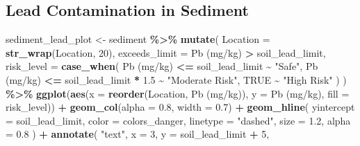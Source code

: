 \documentclass[
]{article}
\newenvironment{Shaded}{\begin{snugshade}}{\end{snugshade}}
\newcommand{\AttributeTok}[1]{\textcolor[rgb]{0.13,0.29,0.53}{#1}}
\newcommand{\ConstantTok}[1]{\textcolor[rgb]{0.56,0.35,0.01}{#1}}
\newcommand{\DecValTok}[1]{\textcolor[rgb]{0.00,0.00,0.81}{#1}}
\newcommand{\FloatTok}[1]{\textcolor[rgb]{0.00,0.00,0.81}{#1}}
\newcommand{\FunctionTok}[1]{\textcolor[rgb]{0.13,0.29,0.53}{\textbf{#1}}}
\newcommand{\NormalTok}[1]{#1}
\newcommand{\OtherTok}[1]{\textcolor[rgb]{0.56,0.35,0.01}{#1}}
\newcommand{\SpecialCharTok}[1]{\textcolor[rgb]{0.81,0.36,0.00}{\textbf{#1}}}
\newcommand{\StringTok}[1]{\textcolor[rgb]{0.31,0.60,0.02}{#1}}
\begin{document}
\subsection{Lead Contamination in
Sediment}\label{lead-contamination-in-sediment}

\begin{Shaded}
\begin{Highlighting}[]
\NormalTok{sediment\_lead\_plot }\OtherTok{\textless{}{-}}\NormalTok{ sediment }\SpecialCharTok{\%\textgreater{}\%}
  \FunctionTok{mutate}\NormalTok{(}
    \AttributeTok{Location =} \FunctionTok{str\_wrap}\NormalTok{(Location, }\DecValTok{20}\NormalTok{),}
    \AttributeTok{exceeds\_limit =} \StringTok{\textasciigrave{}}\AttributeTok{Pb (mg/kg)}\StringTok{\textasciigrave{}} \SpecialCharTok{\textgreater{}}\NormalTok{ soil\_lead\_limit,}
    \AttributeTok{risk\_level =} \FunctionTok{case\_when}\NormalTok{(}
      \StringTok{\textasciigrave{}}\AttributeTok{Pb (mg/kg)}\StringTok{\textasciigrave{}} \SpecialCharTok{\textless{}=}\NormalTok{ soil\_lead\_limit }\SpecialCharTok{\textasciitilde{}} \StringTok{"Safe"}\NormalTok{,}
      \StringTok{\textasciigrave{}}\AttributeTok{Pb (mg/kg)}\StringTok{\textasciigrave{}} \SpecialCharTok{\textless{}=}\NormalTok{ soil\_lead\_limit }\SpecialCharTok{*} \FloatTok{1.5} \SpecialCharTok{\textasciitilde{}} \StringTok{"Moderate Risk"}\NormalTok{,}
      \ConstantTok{TRUE} \SpecialCharTok{\textasciitilde{}} \StringTok{"High Risk"}
\NormalTok{    )}
\NormalTok{  ) }\SpecialCharTok{\%\textgreater{}\%}
  \FunctionTok{ggplot}\NormalTok{(}\FunctionTok{aes}\NormalTok{(}\AttributeTok{x =} \FunctionTok{reorder}\NormalTok{(Location, }\StringTok{\textasciigrave{}}\AttributeTok{Pb (mg/kg)}\StringTok{\textasciigrave{}}\NormalTok{), }\AttributeTok{y =} \StringTok{\textasciigrave{}}\AttributeTok{Pb (mg/kg)}\StringTok{\textasciigrave{}}\NormalTok{, }\AttributeTok{fill =}\NormalTok{ risk\_level)) }\SpecialCharTok{+}
  \FunctionTok{geom\_col}\NormalTok{(}\AttributeTok{alpha =} \FloatTok{0.8}\NormalTok{, }\AttributeTok{width =} \FloatTok{0.7}\NormalTok{) }\SpecialCharTok{+}
  \FunctionTok{geom\_hline}\NormalTok{(}
    \AttributeTok{yintercept =}\NormalTok{ soil\_lead\_limit, }
    \AttributeTok{color =}\NormalTok{ colors\_danger, }
    \AttributeTok{linetype =} \StringTok{"dashed"}\NormalTok{, }
    \AttributeTok{size =} \FloatTok{1.2}\NormalTok{,}
    \AttributeTok{alpha =} \FloatTok{0.8}
\NormalTok{  ) }\SpecialCharTok{+}
  \FunctionTok{annotate}\NormalTok{(}
    \StringTok{"text"}\NormalTok{,}
    \AttributeTok{x =} \DecValTok{3}\NormalTok{, }\AttributeTok{y =}\NormalTok{ soil\_lead\_limit }\SpecialCharTok{+} \DecValTok{5}\NormalTok{,}

\end{Highlighting}
\end{Shaded}
\end{document}
